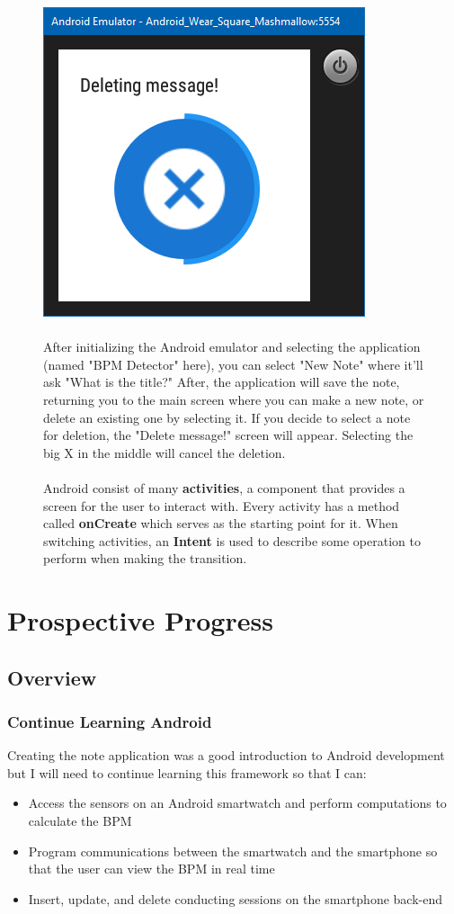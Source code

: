 \documentclass[12pt]{article}
\begin{document}
\begin{figure}
\includegraphics[width=.325\textwidth]{6}
\\\\
After initializing the Android emulator and selecting the application (named "BPM Detector" here), you can select "New Note" where it'll ask "What is the title?" After, the application will save the note, returning you to the main screen where you can make a new note, or delete an existing one by selecting it. If you decide to select a note for deletion, the "Delete message!" screen will appear. Selecting the big X in the middle will cancel the deletion.
\\\\
Android consist of many \textbf{activities}, a component that provides a screen for the user to interact with. Every activity has a method called \textbf{onCreate} which serves as the starting point for it. When switching activities, an \textbf{Intent} is used to describe some operation to perform when making the transition.
\end{figure}

\section{Prospective Progress}
\subsection{Overview}
\subsubsection{Continue Learning Android}
Creating the note application was a good introduction to Android development but I will need to continue learning this framework so that I can:
\begin{itemize}
	\item Access the sensors on an Android smartwatch and perform computations to calculate the BPM
	\item Program communications between the smartwatch and the smartphone so that the user can view the BPM in real time
	\item Insert, update, and delete conducting sessions on the smartphone back-end
\end{itemize}
\end{document}
